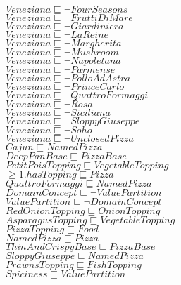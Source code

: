 \documentclass[a4paper,10pt]{article}
\begin{document}
 $Veneziana \sqsubseteq  \lnot FourSeasons$\\ 
 $Veneziana \sqsubseteq  \lnot FruttiDiMare$\\ 
 $Veneziana \sqsubseteq  \lnot Giardiniera$\\ 
 $Veneziana \sqsubseteq  \lnot LaReine$\\ 
 $Veneziana \sqsubseteq  \lnot Margherita$\\ 
 $Veneziana \sqsubseteq  \lnot Mushroom$\\ 
 $Veneziana \sqsubseteq  \lnot Napoletana$\\ 
 $Veneziana \sqsubseteq  \lnot Parmense$\\ 
 $Veneziana \sqsubseteq  \lnot PolloAdAstra$\\ 
 $Veneziana \sqsubseteq  \lnot PrinceCarlo$\\ 
 $Veneziana \sqsubseteq  \lnot QuattroFormaggi$\\ 
 $Veneziana \sqsubseteq  \lnot Rosa$\\ 
 $Veneziana \sqsubseteq  \lnot Siciliana$\\ 
 $Veneziana \sqsubseteq  \lnot SloppyGiuseppe$\\ 
 $Veneziana \sqsubseteq  \lnot Soho$\\ 
 $Veneziana \sqsubseteq  \lnot UnclosedPizza$\\ 
 $Cajun \sqsubseteq NamedPizza$\\ 
 $DeepPanBase \sqsubseteq PizzaBase$\\ 
 $PetitPoisTopping \sqsubseteq VegetableTopping$\\ 
 $ \ge 1.hasTopping \sqsubseteq Pizza$\\ 
 $QuattroFormaggi \sqsubseteq NamedPizza$\\ 
 $DomainConcept \sqsubseteq  \lnot ValuePartition$\\ 
 $ValuePartition \sqsubseteq  \lnot DomainConcept$\\ 
 $RedOnionTopping \sqsubseteq OnionTopping$\\ 
 $AsparagusTopping \sqsubseteq VegetableTopping$\\ 
 $PizzaTopping \sqsubseteq Food$\\ 
 $NamedPizza \sqsubseteq Pizza$\\ 
 $ThinAndCrispyBase \sqsubseteq PizzaBase$\\ 
 $SloppyGiuseppe \sqsubseteq NamedPizza$\\ 
 $PrawnsTopping \sqsubseteq FishTopping$\\ 
 $Spiciness \sqsubseteq ValuePartition$\\ 
\end{document}
